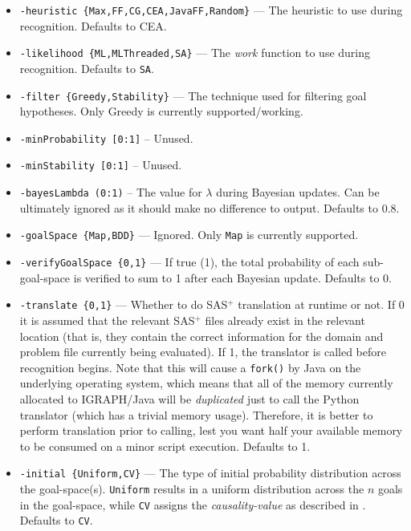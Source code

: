 \documentclass[10pt,a4paper]{article}
\begin{document}
\begin{sloppypar}
\begin{itemize}

\item \texttt{-heuristic \{Max,FF,CG,CEA,JavaFF,Random\}} --- The heuristic to use during recognition. Defaults to CEA.

\item \texttt{-likelihood \{ML,MLThreaded,SA\}} --- The \emph{work} function to use during recognition. Defaults to \texttt{SA}.

\item \texttt{-filter \{Greedy,Stability\}} --- The technique used for filtering goal hypotheses. Only Greedy is currently supported/working.

\item \texttt{-minProbability [0:1]} -- Unused.

\item \texttt{-minStability [0:1]} -- Unused.

\item \texttt{-bayesLambda (0:1)} -- The value for $\lambda$ during Bayesian updates. Can be ultimately ignored as it should make no difference to output. Defaults to 0.8.

\item \texttt{-goalSpace \{Map,BDD\}} --- Ignored. Only \texttt{Map} is currently supported.

\item \texttt{-verifyGoalSpace \{0,1\}} --- If true (1), the total probability of each sub-goal-space is verified to sum to 1 after each Bayesian update. Defaults to 0.

\item \texttt{-translate \{0,1\}} --- Whether to do SAS$^+$ translation at runtime or not. If 0 it is assumed that the relevant SAS$^+$ files already exist in the relevant location (that is, they contain the correct information for the domain and problem file currently being evaluated). If 1, the translator is called before recognition begins. Note that this will cause a \texttt{fork()} by Java on the underlying operating system, which means that all of the memory currently allocated to \textsc{IGRAPH}/Java will be \emph{duplicated} just to call the Python translator (which has a trivial memory usage). Therefore, it is better to perform translation prior to calling, lest you want half your available memory to be consumed on a minor script execution. Defaults to 1.

\item \texttt{-initial \{Uniform,CV\}} --- The type of initial probability distribution across the goal-space(s). \texttt{Uniform} results in a uniform distribution across the $n$ goals in the goal-space, while \texttt{CV} assigns the \emph{causality-value} as described in \cite{PattisonPhD}. Defaults to \texttt{CV}.


\end{itemize}
\end{sloppypar}
\end{document}
